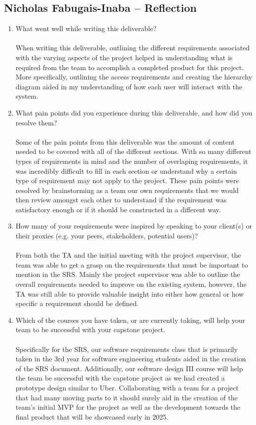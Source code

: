 \documentclass[12pt]{article}
\begin{document}
\subsection*{Nicholas Fabugais-Inaba -- Reflection}

\begin{enumerate}
  \item What went well while writing this deliverable?\\\\
  When writing this deliverable, outlining the different requirements associated
  with the varying aspects of the project helped in understanding what is required
  from the team to accomplish a completed product for this project. More specifically,
  outlining the access requirements and creating the hierarchy diagram aided in
  my understanding of how each user will interact with the system.
  \item What pain points did you experience during this deliverable, and how
  did you resolve them?\\\\
  Some of the pain points from this deliverable was the amount of content 
  needed to be covered with all of the different sections. With so many different
  types of requirements in mind and the number of overlaping requirements, it
  was incredibly difficult to fill in each section or understand why a certain
  type of requirement may not apply to the project. These pain points were resolved
  by brainstorming as a team our own requirements that we would then review
  amongst each other to understand if the requirement was satisfactory enough
  or if it should be constructed in a different way.
  \item How many of your requirements were inspired by speaking to your
  client(s) or their proxies (e.g. your peers, stakeholders, potential users)?
  \\\\
  From both the TA and the initial meeting with the project supervisor, the team
  was able to get a grasp on the requirements that must be important to mention
  in the SRS. Mainly the project supervisor was able to outline the overall
  requirements needed to improve on the existing system, however, the TA was 
  still able to provide valuable insight into either how general or how specific
  a requirement should be defined.
  \item Which of the courses you have taken, or are currently taking, will help
  your team to be successful with your capstone project.\\\\
  Specifically for the SRS, our software requirements class that is primarily taken
  in the 3rd year for software engineering students aided in the creation
  of the SRS document. Additionally, our software design III course will help the
  team be successful with the capstone project as we had created a prototype design
  similar to Uber. Collaborating with a team for a project that had many moving
  parts to it should surely aid in the creation of the team's initial MVP for
  the project as well as the development towards the final product that will
  be showcased early in 2025.


\end{enumerate}
\end{document}
